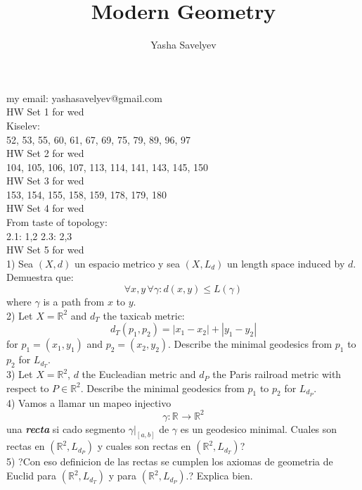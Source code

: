 \documentclass{amsart}
\title{Modern Geometry}
\author{Yasha Savelyev}
\begin{document}
\maketitle
\section{}
my email: yashasavelyev@gmail.com
\\

HW Set 1 for wed
\\

Kiselev: 
\\

52, 53, 55, 60, 61, 67, 69, 75, 79, 89, 96, 97
\\

HW Set 2 for wed
\\

104, 105, 106, 107, 113, 114, 141, 143, 145, 150
\\

HW Set 3 for wed
\\

153, 154, 155, 158, 159, 178, 179, 180
\\


HW Set 4 for wed
\\


From taste of topology:
\\

2.1: 1,2 
2.3: 2,3 
\\


HW Set 5 for wed
\\

1) Sea $(X, d) $ un espacio metrico y sea $(X, L _{d})$ un length space induced by $d$. Demuestra que: $$\forall x,y \, \forall \gamma: d (x,y) \leq L (\gamma)$$ where $\gamma$  is a path from $x$ to $y$. 
\\

2) Let $X = \mathbb{R} ^{2}$ and $d _{T}$ the taxicab metric:
$$d _{T} (p _{1}, p _{2}) = |x _{1} - x _{2}| + |y _{1} - y _{2}|$$ for $p _{1} = (x _{1}, y _{1}) $ and $p _{2} = (x _{2}, y _{2})$.
Describe the minimal geodesics from $p _{1}$ to $p _{2}$ for $L _{d _{T}}$. 
\\

3) Let $X = \mathbb{R} ^{2}$, $d$  the Eucleadian metric and $d _{P}$ the Paris railroad metric with respect to $P \in \mathbb{R} ^{2}$. Describe the minimal geodesics from $p _{1}$  to $p _{2}$ for $L _{d _{P}}$. 
\\

4) Vamos a llamar un mapeo injectivo $$\gamma: \mathbb{R} ^{} \to \mathbb{R} ^{2} $$ una \textbf{\emph{recta}} si cado segmento $\gamma | _{[a,b]}$ de $\gamma$ es un geodesico minimal. Cuales son rectas en $(\mathbb{R} ^{2}, L _{d _{P}}) $
y cuales son rectas en $(\mathbb{R} ^{2}, L _{d _{T}}) $?
\\

5) ?Con eso definicion de las rectas se cumplen los axiomas de geometria de Euclid para $(\mathbb{R} ^{2}, L _{d _{T}}) $ y para $(\mathbb{R} ^{2}, L _{d _{P}}) $.? Explica bien.
\end{document}
